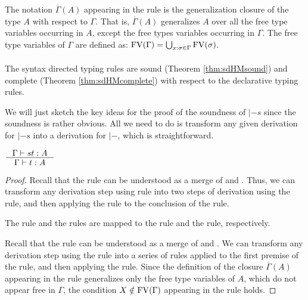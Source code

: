 The notation $\overline{\Gamma}(A)$ appearing in the rule  is
the generalization closure of the type $A$ with respect to $\Gamma$. 
That is, $\overline{\Gamma}(A)$
generalizes $A$ over all the free type variables occurring in $A$, except the free types
variables occurring in $\Gamma$. The free type variables of $\Gamma$ are defined as:
$\mathop{\mathrm{FV}}(\Gamma) = \bigcup_{x:\sigma\in \Gamma} \mathop{\mathrm{FV}}(\sigma)$.

\paragraph{}
The syntax directed typing rules are sound (Theorem \ref{thm:sdHMsound})
and complete (Theorem \ref{thm:sdHMcomplete}) with respect to
the declarative typing rules.

We will just sketch the key ideas for the proof of the soundness of $|-s$
since the soundness is rather obvious. All we need to do is transform
any given derivation for $|-s$ into a derivation for $|-$, which is
straightforward.
\begin{theorem}
$ \inference{\Gamma |-s t : A}{\Gamma |- t : A} $
\label{thm:sdHMsound}
\end{theorem}
\begin{proof}
Recall that the  rule can be understood as a merge of
 and . Thus, we can transform any derivation
step using  rule into two steps of derivation using
the  rule, and then applying the  rule
to the conclusion of the  rule.

The  rule and the  rules are mapped
to the  rule and the  rule, respectively.

Recall that the  rule can be understood as a merge of
 and . We can transform any derivation step
using the  rule into a series of  rules
applied to the first premise of the  rule, and then applying
the  rule. Since the definition of the closure
$\overline{\Gamma}(A)$ appearing in the  rule
generalizes only the free type variables of $A$, which do not
appear free in $\Gamma$, the condition $X\notin\mathop{\mathrm{FV}}(\Gamma)$ appearing
in the  rule holds.
\end{proof}

